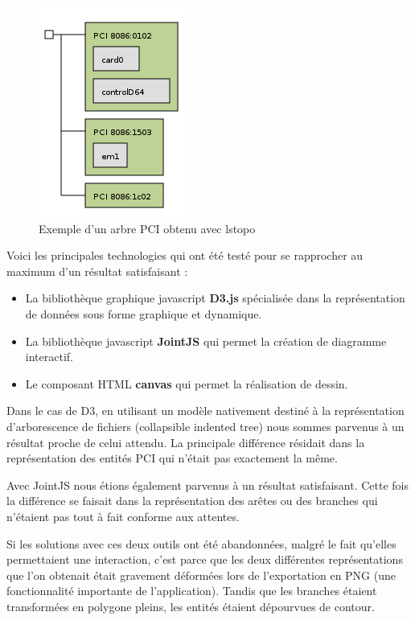 \documentclass [a4paper,11pt]{article}
\begin{document}
\begin{figure}[!h]
\centering
\includegraphics[scale=0.5]{img/treePCI.png}
\caption[Résultats]{Exemple d'un arbre PCI obtenu avec lstopo}
\end{figure}
\newline

Voici les principales technologies qui ont été testé pour se rapprocher au maximum d’un résultat satisfaisant :
\newline

\begin{itemize}
 \item La bibliothèque graphique javascript \textbf{D3.js} spécialisée dans la représentation de données sous forme graphique et dynamique.
 \item La bibliothèque javascript \textbf{JointJS} qui permet la création de diagramme interactif.
 \item Le composant HTML \textbf{canvas} qui permet la réalisation de dessin.
 \newline
\end{itemize}
\newline

Dans le cas de D3, en utilisant un modèle nativement destiné à la représentation d’arborescence de fichiers (collapsible indented tree) nous sommes parvenus à un résultat proche de celui attendu. La principale différence résidait dans la représentation des entités PCI qui n’était pas exactement la même.
\newline

Avec JointJS nous étions également parvenus à un résultat satisfaisant. Cette fois la différence se faisait dans la représentation des arêtes ou des branches qui n’étaient pas tout à fait conforme aux attentes.
\newline

Si les solutions avec ces deux outils ont été abandonnées, malgré le fait qu’elles permettaient une interaction, c’est parce que les deux différentes représentations que l’on obtenait était gravement déformées lors de l’exportation en PNG (une fonctionnalité importante de l’application). Tandis que les branches étaient transformées en polygone pleins, les entités étaient dépourvues de contour. 
\newline
\end{document}
